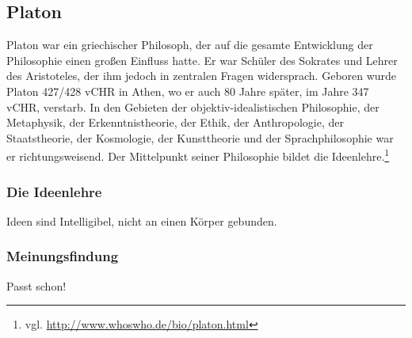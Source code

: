 \subsection{Platon}
Platon war ein griechischer Philosoph, der auf die gesamte Entwicklung der Philosophie einen großen Einfluss hatte. Er war Schüler des Sokrates und Lehrer des Aristoteles, der ihm jedoch in zentralen Fragen widersprach. Geboren wurde Platon 427/428 \ac{vCHR} in Athen, wo er auch 80 Jahre später, im Jahre 347 \ac{vCHR}, verstarb. In den Gebieten der objektiv-idealistischen Philosophie, der Metaphysik, der Erkenntnistheorie, der Ethik, der Anthropologie, der Staatstheorie, der Kosmologie, der Kunsttheorie und der Sprachphilosophie war er richtungsweisend. Der Mittelpunkt seiner Philosophie bildet die Ideenlehre.\footnote{vgl. \url{http://www.whoswho.de/bio/platon.html}}

\subsubsection{Die Ideenlehre}
Ideen sind Intelligibel, nicht an einen Körper gebunden.
\subsubsection{Meinungsfindung}
Passt schon!